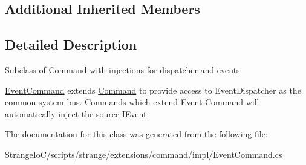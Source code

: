 \subsection*{Additional Inherited Members}


\subsection{Detailed Description}
Subclass of \hyperlink{classstrange_1_1extensions_1_1command_1_1impl_1_1_command}{Command} with injections for dispatcher and events. 

\hyperlink{classstrange_1_1extensions_1_1command_1_1impl_1_1_event_command}{Event\-Command} extends \hyperlink{classstrange_1_1extensions_1_1command_1_1impl_1_1_command}{Command} to provide access to Event\-Dispatcher as the common system bus. Commands which extend Event \hyperlink{classstrange_1_1extensions_1_1command_1_1impl_1_1_command}{Command} will automatically inject the source I\-Event. 

The documentation for this class was generated from the following file\-:\begin{DoxyCompactItemize}
\item 
Strange\-Io\-C/scripts/strange/extensions/command/impl/Event\-Command.\-cs\end{DoxyCompactItemize}
